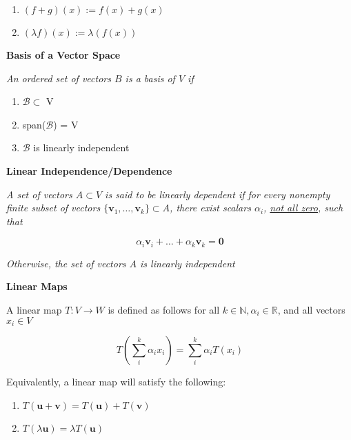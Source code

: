 \documentclass{article}
\newcommand{\R}{\mathbb{R}}
\begin{document}
\begin{enumerate}
    \renewcommand{\labelenumi}{\roman{enumi}}
    \item $(f + g)(x) := f(x) + g(x)$
    \item $(\lambda f)(x) := \lambda (f(x))$
\end{enumerate}

\vspace{0.5cm}

\noindent \textbf{Basis of a Vector Space}

\textit{An ordered set of vectors $B$ is a basis of $V$ if}

\begin{enumerate}
    \renewcommand{\labelenumi}{\roman{enumi}}
    \item $\mathcal{B} \subset$ V
    \item span($\mathcal{B}$) = V
    \item $\mathcal{B}$ is linearly independent
\end{enumerate}

\vspace{0.5cm}

\noindent \textbf{Linear Independence/Dependence}

\textit{A set of vectors $A \subset V$ is said to be linearly dependent if for every nonempty finite subset of vectors $\{ \bm{v}_1, \ldots , \bm{v}_k \} \subset A$, there exist scalars $\alpha_i$, \underline{not all zero}, such that}

$$\alpha_i \bm{v}_i + \ldots + \alpha_k \bm{v}_k = \bm{0}$$

\textit{Otherwise, the set of vectors $A$ is linearly independent}

\vspace{0.5cm}

\noindent \textbf{Linear Maps}

A linear map $T:V \to W $ is defined as follows for all $k \in \mathbb{N}, \alpha_{i} \in \R$, and all vectors $x_i \in V$

$$T\left(\sum\limits_{i}^{k}\alpha_{i}x_{i}\right) = \sum\limits_{i}^{k}\alpha_{i}T(x_{i})$$

Equivalently, a linear map will satisfy the following:

\begin{enumerate}
    \renewcommand{\labelenumi}{\roman{enumi}}
    \item $T(\bm{u} + \bm{v}) = T(\bm{u}) + T(\bm{v})$
    \item $T(\lambda \bm{u}) = \lambda T(\bm{u})$
\end{enumerate}
\end{document}
